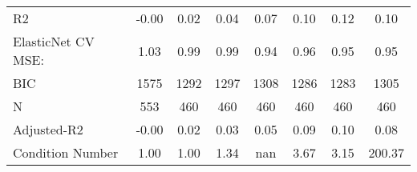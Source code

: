 \begin{table*}
\begin{center}
\begin{tabular}{lccccccc}
R2                                             & -0.00    & 0.02       & 0.04    & 0.07    & 0.10     & 0.12               & 0.10    \\
ElasticNet CV MSE:                             & 1.03     & 0.99       & 0.99    & 0.94    & 0.96     & 0.95               & 0.95    \\
BIC                                            & 1575     & 1292       & 1297    & 1308    & 1286     & 1283               & 1305    \\
N                                              & 553      & 460        & 460     & 460     & 460      & 460                & 460     \\
Adjusted-R2                                    & -0.00    & 0.02       & 0.03    & 0.05    & 0.09     & 0.10               & 0.08    \\
Condition Number                               & 1.00     & 1.00       & 1.34    & nan     & 3.67     & 3.15               & 200.37  \\
\hline
\end{tabular}
\end{center}
\end{table*}
